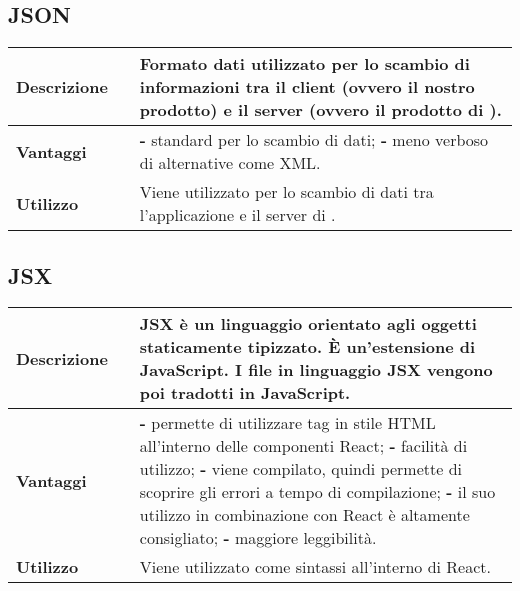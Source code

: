 \vspace{40px}
\subsection{JSON}
\label{JSON}
\begin{table}[H]
	\centering
	\begin{tabular}{p{2cm}p{0.5cm}p{11.5cm}}
		\arrayrulecolor{lightgray}
		\toprule
		\textbf{Descrizione} & &
		Formato dati utilizzato per lo scambio di informazioni tra il client (ovvero il nostro prodotto) e il server (ovvero il prodotto di \riskapp).
		\\ \midrule
		\textbf{Vantaggi} & &
		\textbf{- } standard per lo scambio di dati;
		\newline
		\textbf{- } meno verboso di alternative come XML.
		\\ \midrule
		\textbf{Utilizzo} & &
		Viene utilizzato per lo scambio di dati tra l'applicazione \progetto e il server di \riskapp.
		\\ \bottomrule
	\end{tabular}
\end{table}



\newpage
\subsection{JSX}
\label{JSX}
\begin{table}[H]
	\centering
	\begin{tabular}{p{2cm}p{0.5cm}p{11.5cm}}
		\arrayrulecolor{lightgray}
		\toprule
		\textbf{Descrizione} & &
		JSX è un linguaggio orientato agli oggetti staticamente tipizzato. È un'estensione di JavaScript.
		I file in linguaggio JSX vengono poi tradotti in JavaScript.
		\\ \midrule
		\textbf{Vantaggi} & &
		\textbf{- }permette di utilizzare tag in stile HTML all'interno delle componenti React;
		\newline
		\textbf{- }facilità di utilizzo;
		\newline
		\textbf{- }viene compilato, quindi permette di scoprire gli errori a tempo di compilazione;
		\newline
		\textbf{- }il suo utilizzo in combinazione con React è altamente consigliato;
		\newline
		\textbf{- } maggiore leggibilità.
		\\ \midrule
		\textbf{Utilizzo} & &
		Viene utilizzato come sintassi all'interno di React.
		\\ \bottomrule
	\end{tabular}
\end{table}


